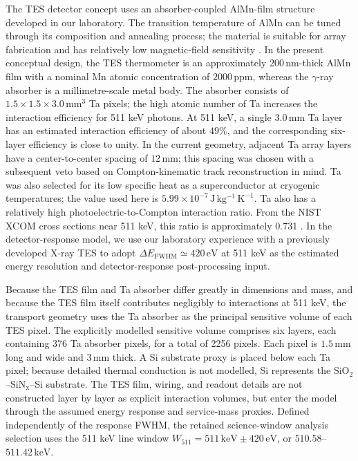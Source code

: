 \documentclass[11pt]{article}
\begin{document}
The TES detector concept uses an absorber-coupled AlMn-film structure developed
in our laboratory. The transition temperature of AlMn can be tuned through its
composition and annealing process; the material is suitable for array fabrication
and has relatively low magnetic-field sensitivity
\cite{Xie2026AlMn,Vavagiakis2017AlMnMagnetic}. In the present conceptual design,
the TES thermometer is an approximately $200\,\mathrm{nm}$-thick AlMn film with
a nominal Mn atomic concentration of $2000\,\mathrm{ppm}$, whereas the $\gamma$-ray absorber is a
millimetre-scale metal body. The absorber consists of
$1.5\times1.5\times3.0\,\mathrm{mm^3}$ Ta pixels; the high atomic number of Ta
increases the interaction efficiency for 511 keV photons. At 511 keV, a single
$3.0\,\mathrm{mm}$ Ta layer has an estimated interaction efficiency of about
$49\%$, and the corresponding six-layer efficiency is close to unity. In the
current geometry, adjacent Ta array layers have a center-to-center spacing of
$12\,\mathrm{mm}$; this spacing was chosen with a subsequent veto based on
Compton-kinematic track reconstruction in mind. Ta was also selected for its low
specific heat as a superconductor at cryogenic temperatures; the value used here
is $5.99\times10^{-7}\,\mathrm{J\,kg^{-1}\,K^{-1}}$. Ta also has a relatively
high photoelectric-to-Compton interaction ratio. From
the NIST XCOM cross sections near 511 keV, this ratio is approximately 0.731
\cite{NISTXCOM}. In the detector-response model, we use our laboratory experience
with a previously developed X-ray TES \cite{Xie2026AlMn} to adopt
$\Delta E_{\mathrm{FWHM}}\simeq420\,\mathrm{eV}$ at 511 keV as the estimated
energy resolution and detector-response post-processing input.

Because the TES film and Ta absorber differ greatly in dimensions and mass, and
because the TES film itself contributes negligibly to interactions at 511 keV,
the transport geometry uses the Ta absorber as the principal sensitive volume of
each TES pixel. The explicitly modelled sensitive volume comprises six layers,
each containing 376 Ta absorber pixels, for a total of 2256 pixels. Each pixel is
$1.5\,\mathrm{mm}$ long and wide and $3\,\mathrm{mm}$ thick. A Si substrate proxy
is placed below each Ta pixel; because detailed thermal conduction is not modelled,
Si represents the $\mathrm{SiO_2}$--$\mathrm{SiN_x}$--Si substrate. The TES film,
wiring, and readout details are not constructed layer by layer as explicit
interaction volumes, but enter the model through the assumed energy response and
service-mass proxies. Defined independently of the response FWHM, the retained science-window
analysis selection uses the 511 keV line window
$W_{511}=511\,\mathrm{keV}\pm420\,\mathrm{eV}$, or
$510.58$--$511.42\,\mathrm{keV}$.
\end{document}
